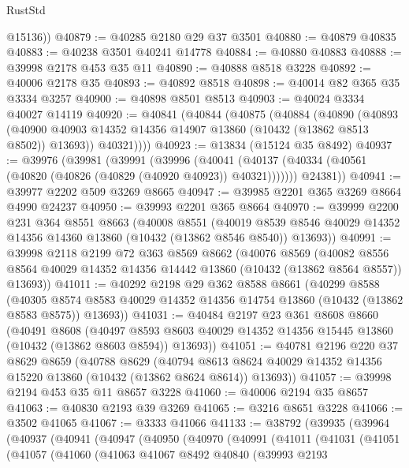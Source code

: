 \begin{lexlean}{RustStd}
\begin{coremodule}
        @15136))
@40879 := @40285 @2180 @29 @37 @3501
@40880 := @40879 @40835
@40883 := @40238 @3501 @40241 @14778
@40884 := @40880 @40883
@40888 := @39998 @2178 @453 @35 @11
@40890 := @40888 @8518 @3228
@40892 := @40006 @2178 @35
@40893 := @40892 @8518
@40898 := @40014 @82 @365 @35 @3334 @3257
@40900 := @40898 @8501 @8513
@40903 := @40024 @3334 @40027 @14119
@40920 := @40841
    (@40844
      (@40875
        (@40884
          (@40890
            (@40893
              (@40900 @40903 @14352 @14356 @14907 @13860 (@10432 (@13862 @8513 @8502)) @13693))
            @40321))))
@40923 := @13834 (@15124 @35 @8492)
@40937 := @39976
    (@39981
      (@39991
        (@39996
          (@40041 (@40137 (@40334 (@40561 (@40820 (@40826 (@40829 (@40920 @40923)) @40321)))))))
        @24381))
@40941 := @39977 @2202 @509 @3269 @8665
@40947 := @39985 @2201 @365 @3269 @8664 @4990 @24237
@40950 := @39993 @2201 @365 @8664
@40970 := @39999
    @2200
    @231
    @364
    @8551
    @8663
    (@40008
      @8551
      (@40019 @8539 @8546 @40029 @14352 @14356 @14360 @13860 (@10432 (@13862 @8546 @8540)) @13693))
@40991 := @39998
    @2118
    @2199
    @72
    @363
    @8569
    @8662
    (@40076
      @8569
      (@40082 @8556 @8564 @40029 @14352 @14356 @14442 @13860 (@10432 (@13862 @8564 @8557)) @13693))
@41011 := @40292
    @2198
    @29
    @362
    @8588
    @8661
    (@40299
      @8588
      (@40305 @8574 @8583 @40029 @14352 @14356 @14754 @13860 (@10432 (@13862 @8583 @8575)) @13693))
@41031 := @40484
    @2197
    @23
    @361
    @8608
    @8660
    (@40491
      @8608
      (@40497 @8593 @8603 @40029 @14352 @14356 @15445 @13860 (@10432 (@13862 @8603 @8594)) @13693))
@41051 := @40781
    @2196
    @220
    @37
    @8629
    @8659
    (@40788
      @8629
      (@40794 @8613 @8624 @40029 @14352 @14356 @15220 @13860 (@10432 (@13862 @8624 @8614)) @13693))
@41057 := @39998 @2194 @453 @35 @11 @8657 @3228
@41060 := @40006 @2194 @35 @8657
@41063 := @40830 @2193 @39 @3269
@41065 := @3216 @8651 @3228
@41066 := @3502 @41065
@41067 := @3333 @41066
@41133 := @38792
    (@39935
      (@39964
        (@40937
          (@40941
            (@40947
              (@40950
                (@40970
                  (@40991
                    (@41011
                      (@41031
                        (@41051
                          (@41057
                            (@41060
                              (@41063
                                @41067
                                @8492
                                @40840
                                (@39993
                                  @2193

\end{coremodule}
\end{lexlean}
